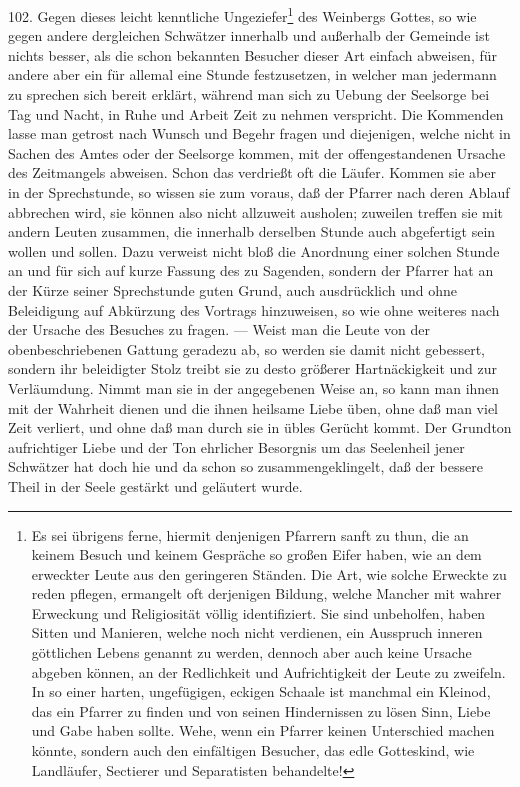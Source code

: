 102. Gegen dieses leicht kenntliche Ungeziefer\footnote{Es sei übrigens ferne, hiermit denjenigen Pfarrern sanft zu thun, die an keinem Besuch und keinem Gespräche so großen Eifer haben, wie an dem erweckter Leute aus den geringeren Ständen. Die Art, wie solche Erweckte zu reden pflegen, ermangelt oft derjenigen Bildung, welche Mancher mit wahrer Erweckung und Religiosität völlig identifiziert. Sie sind unbeholfen, haben Sitten und Manieren, welche noch nicht verdienen, ein Ausspruch inneren göttlichen Lebens genannt zu werden, dennoch aber auch keine Ursache abgeben können, an der Redlichkeit und Aufrichtigkeit der Leute zu zweifeln. In so einer harten, ungefügigen, eckigen Schaale ist manchmal ein Kleinod, das ein Pfarrer zu finden und von seinen Hindernissen zu lösen Sinn, Liebe und Gabe haben sollte. Wehe, wenn ein Pfarrer keinen Unterschied machen könnte, sondern auch den einfältigen Besucher, das edle Gotteskind, wie Landläufer, Sectierer und Separatisten behandelte!} des Weinbergs Gottes, so wie gegen andere dergleichen Schwätzer innerhalb und außerhalb der Gemeinde ist nichts besser, als die schon bekannten Besucher dieser Art einfach abweisen, für andere aber ein für allemal eine Stunde festzusetzen, in welcher man jedermann zu sprechen sich bereit erklärt, während man sich zu Uebung der Seelsorge bei Tag und Nacht, in Ruhe und Arbeit Zeit zu nehmen verspricht. Die Kommenden lasse man getrost nach Wunsch und Begehr fragen und diejenigen, welche nicht in Sachen des Amtes oder der Seelsorge kommen, mit der offengestandenen Ursache des Zeitmangels abweisen. Schon das verdrießt oft die Läufer. Kommen sie aber in der Sprechstunde, so wissen sie zum voraus, daß der Pfarrer nach
deren Ablauf abbrechen wird, sie können also nicht allzuweit ausholen; zuweilen treffen sie mit andern Leuten zusammen, die innerhalb derselben Stunde auch abgefertigt sein wollen und sollen. Dazu verweist nicht bloß die Anordnung einer solchen Stunde an und für sich auf kurze Fassung des zu Sagenden, sondern der Pfarrer hat an der Kürze seiner Sprechstunde guten Grund, auch ausdrücklich und ohne Beleidigung auf Abkürzung des Vortrags hinzuweisen, so wie ohne weiteres nach der Ursache des Besuches zu fragen. — Weist man die Leute von der obenbeschriebenen Gattung geradezu ab, so werden sie damit nicht gebessert, sondern ihr beleidigter Stolz treibt sie zu desto größerer Hartnäckigkeit und zur Verläumdung. Nimmt man sie in der angegebenen Weise an, so kann man ihnen mit der Wahrheit dienen und die ihnen heilsame Liebe üben, ohne daß man viel Zeit verliert, und ohne daß man durch sie in übles Gerücht kommt. Der Grundton aufrichtiger Liebe und der Ton ehrlicher Besorgnis um das Seelenheil jener Schwätzer hat doch hie und da schon so zusammengeklingelt, daß der bessere Theil in der Seele gestärkt und geläutert wurde.

